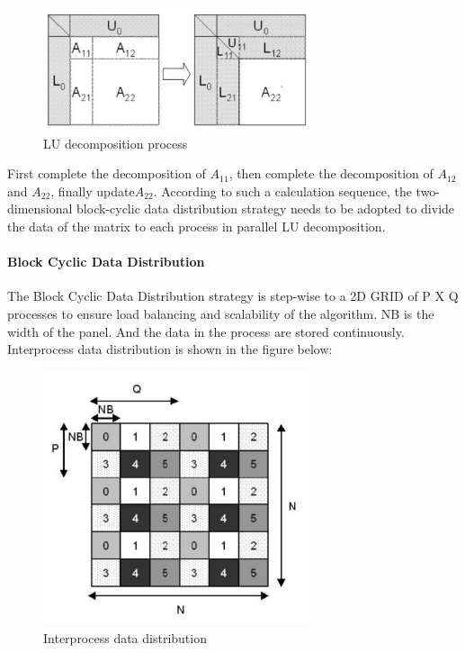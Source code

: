\documentclass[a4paper,12pt]{article}
\begin{document}
\begin{figure}[H]
    \centering
    \includegraphics[width=0.7\textwidth]{LU_decomposition_process.png}
    \caption{LU decomposition process}
    \label{fig:lu_decomposition}
\end{figure}

First complete the decomposition of $A_{11}$, then complete the decomposition of $A_{12}$and $A_{22}$, finally update$A_{22}$. According to such a calculation sequence, the two-dimensional block-cyclic data distribution strategy needs to be adopted to divide the data of the matrix to each process in parallel LU decomposition.

\paragraph{Block Cyclic Data Distribution}

The Block Cyclic Data Distribution strategy is step-wise to a 2D GRID of P X Q processes to ensure load balancing and scalability of the algorithm. NB is the width of the panel. And the data in the process are stored continuously. Interprocess data distribution is shown in the figure below:

\begin{figure}[H]
    \centering
    \includegraphics[width=0.7\textwidth]{Interprocess_data_distribution.png}
    \caption{Interprocess data distribution}
    \label{fig:interprocess_data}
\end{figure}
\end{document}
